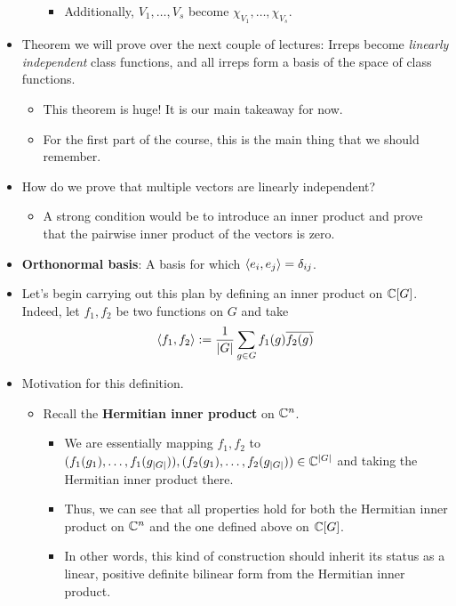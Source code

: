\documentclass[../notes.tex]{subfiles}
\begin{document}
\begin{itemize}
\begin{itemize}
\begin{itemize}
            \item Additionally, $V_1,\dots,V_s$ become $\chi_{V_1},\dots,\chi_{V_s}$.
        \end{itemize}
    \end{itemize}
    \item Theorem we will prove over the next couple of lectures: Irreps become \emph{linearly independent} class functions, and all irreps form a basis of the space of class functions.
    \begin{itemize}
        \item This theorem is huge! It is our main takeaway for now.
        \item For the first part of the course, this is the main thing that we should remember.
    \end{itemize}
    \item How do we prove that multiple vectors are linearly independent?
    \begin{itemize}
        \item A strong condition would be to introduce an inner product and prove that the pairwise inner product of the vectors is zero.
    \end{itemize}
    \item \textbf{Orthonormal basis}: A basis for which $\left\langle{e_i,e_j}\right\rangle=\delta_{ij}$.
    \item Let's begin carrying out this plan by defining an inner product on $\mathbb{C}[G]$. Indeed, let $f_1,f_2$ be two functions on $G$ and take
    \begin{equation*}
        \left\langle{f_1,f_2}\right\rangle := \frac{1}{|G|}\sum_{g\in G}f_1(g)\overline{f_2(g)}
    \end{equation*}
    \item Motivation for this definition.
    \begin{itemize}
        \item Recall the \textbf{Hermitian inner product} on $\mathbb{C}^n$.
        \begin{itemize}
            \item We are essentially mapping $f_1,f_2$ to $(f_1(g_1),\dots,f_1(g_{|G|})),(f_2(g_1),\dots,f_2(g_{|G|}))\in\mathbb{C}^{|G|}$ and taking the Hermitian inner product there.
            \item Thus, we can see that all properties hold for both the Hermitian inner product on $\mathbb{C}^n$ and the one defined above on $\mathbb{C}[G]$.
            \item In other words, this kind of construction should inherit its status as a linear, positive definite bilinear form from the Hermitian inner product.

\end{itemize}
\end{itemize}
\end{itemize}
\end{document}
